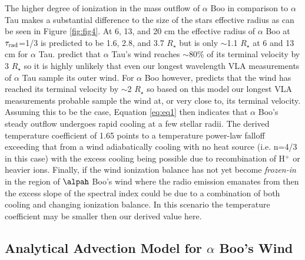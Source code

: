 \documentclass[iop]{emulateapj}
\begin{document}
The higher degree of ionization in the mass outflow of $\alpha$ Boo in comparison to $\alpha$ Tau makes a substantial difference to the size of the stars effective radius as can be seen in Figure \ref{fig:fig4}. At 6, 13, and 20 cm the effective radius of $\alpha$ Boo at $\tau _{\rm{rad}}$=1/3 is predicted to be 1.6, 2.8, and 3.7 $R_{\star}$ but is only $\sim$1.1 $R_{\star}$ at 6 and 13 cm for $\alpha$ Tau. \cite{1998ApJ...503..396R} predict that $\alpha$ Tau's wind reaches $\sim$80\% of its terminal velocity by 3 $R_{\star}$ so it is highly unlikely that even our longest wavelength VLA measurements of $\alpha$ Tau sample its outer wind. For $\alpha$ Boo however, \cite{1985pssl.proc..351D} predicts that the wind has reached its terminal velocity by $\sim$2 $R_{\star}$ so based on this model our longest VLA measurements probable sample the wind at, or very close to, its terminal velocity. Assuming this to be the case, Equation \ref{eq:eq1} then indicates that $\alpha$ Boo's steady outflow undergoes rapid cooling at a few stellar radii. The derived temperature coefficient of 1.65 points to a temperature power-law falloff exceeding that from a wind adiabatically cooling with no heat source (i.e. n=4/3 in this case) with the excess cooling being possible due to recombination of H$^{+}$ or heavier ions. Finally, if the wind ionization balance has not yet become \textit{frozen-in} in the region of $\alpah$ Boo's wind where the radio emission emanates from then the excess slope of the spectral index could be due to a combination of both cooling and changing ionization balance. In this scenario the temperature coefficient may be smaller then our derived value here.

\subsection{Analytical Advection Model for $\alpha$ Boo's Wind} \label{disc:disc4}
\end{document}

